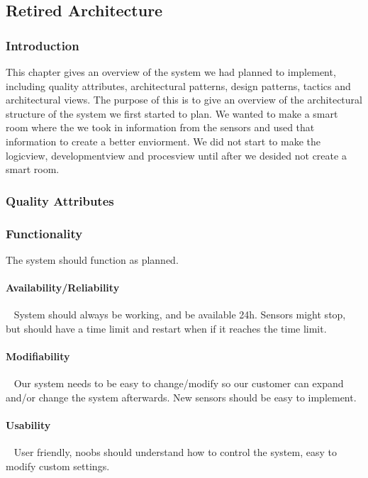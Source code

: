 \documentclass[../document]{subfiles}
\begin{document}
\subsection{Retired Architecture}
\label{retired_architecture}
\subsubsection{Introduction}
This chapter gives an overview of the system we had planned to implement, including quality attributes, architectural patterns, design patterns, tactics and architectural views. The purpose of this is to give an overview of the architectural structure of the system we first started to plan. We wanted to make a smart room where the we took in information from the sensors and used that information to create a better enviorment. We did not start to make the logicview, developmentview and procesview until after we desided not create a smart room.

\subsubsection{Quality Attributes}
\subsubsection{Functionality}
The system should function as planned. 

\paragraph{Availability/Reliability} \ \newline
System should always be working, and be available 24h. Sensors might stop, but should have a time limit and restart when if it reaches the time limit. 

\paragraph{Modifiability} \ \newline
Our system needs to be easy to change/modify so our customer can expand and/or change the system afterwards. New sensors should be easy to implement.

\paragraph{Usability} \ \newline
User friendly, noobs should understand how to control the system, easy to modify custom settings.
\end{document}

